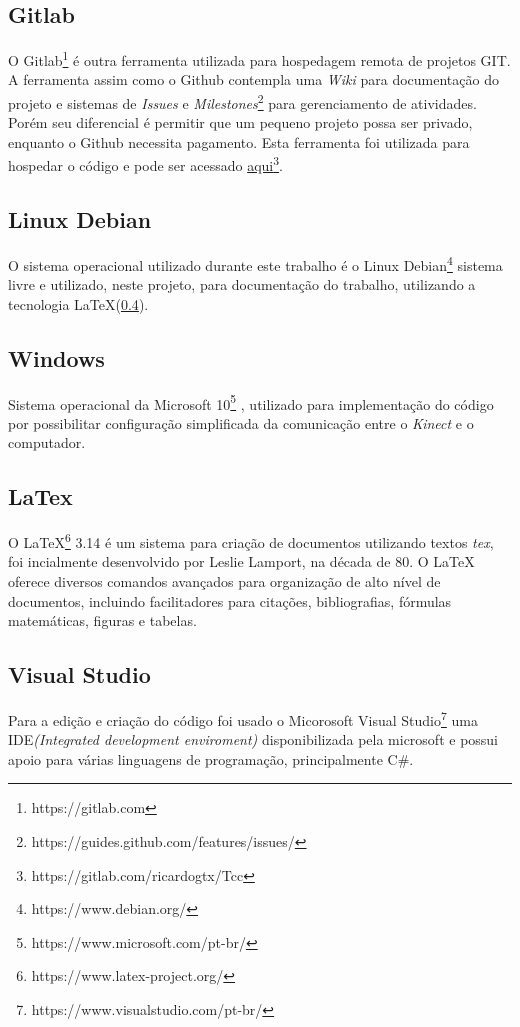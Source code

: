     \subsection{Gitlab}\label{sub:gitlab}
      O Gitlab\footnote{https://gitlab.com} é outra ferramenta utilizada para hospedagem remota de projetos GIT.
      A ferramenta assim como o Github contempla uma \textit{Wiki} para documentação do projeto e sistemas de \textit{Issues} e
      \textit{Milestones}\footnote{https://guides.github.com/features/issues/} para gerenciamento de atividades. Porém seu diferencial é permitir que um
    pequeno projeto possa ser privado, enquanto o Github necessita pagamento. Esta ferramenta foi utilizada para hospedar o código e pode ser acessado
    \href{https://gitlab.com/ricardogtx/Tcc}{aqui}\footnote{https://gitlab.com/ricardogtx/Tcc}.

    \subsection{Linux Debian}\label{sub:linuxdebian}
    		O sistema operacional utilizado durante este trabalho é o Linux Debian\footnote{https://www.debian.org/} sistema livre
    e utilizado, neste projeto, para documentação do trabalho, utilizando a
    tecnologia LaTeX(\ref{sub:latex}).

    \subsection{Windows}\label{sub:windows}
    Sistema operacional da Microsoft 10\footnote{https://www.microsoft.com/pt-br/} , utilizado para implementação do código
    por possibilitar configuração simplificada da comunicação entre o \textit{Kinect} e o computador.

    \subsection{LaTex}\label{sub:latex}
    O LaTeX\footnote{https://www.latex-project.org/} 3.14 é um sistema para criação de documentos utilizando textos \textit{tex},
     foi incialmente desenvolvido por Leslie Lamport, na década de 80. O LaTeX oferece diversos comandos avançados para organização
     de alto nível de documentos, incluindo facilitadores para citações, bibliografias, fórmulas matemáticas, figuras e tabelas.

     \subsection{Visual Studio}\label{sub:codigo}
       Para a edição e criação do código foi usado o Micorosoft Visual Studio\footnote{https://www.visualstudio.com/pt-br/} uma IDE\textit{(Integrated development enviroment)} disponibilizada pela microsoft
    e possui apoio para várias linguagens de programação, principalmente C\#.

